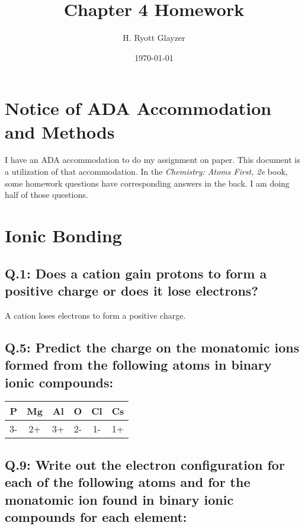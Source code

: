 \documentclass[11pt, letterpaper]{article}
\begin{document}


\title{Chapter 4 Homework}
\author{H. Ryott Glayzer}
\date{\today}


\maketitle

\section*{Notice of ADA Accommodation and Methods}
I have an ADA accommodation to do my assignment on paper.
This document is a utilization of that accommodation.
In the \textit{Chemistry: Atoms First, 2e} book,
some homework questions have corresponding answers in the back.
I am doing half of those questions.

\section{Ionic Bonding}

\subsection*{Q.1: Does a cation gain protons to form a positive charge or does it lose electrons?}
A cation loses electrons to form a positive charge.

\subsection*{Q.5: Predict the charge on the monatomic ions formed
from the following atoms in binary ionic compounds:}

\begin{center}
	\begin{tabular}{|c|c|c|c|c|c|}
		\hline
		P & Mg & Al & O & Cl & Cs \\
		\hline
		3- & 2+ & 3+ & 2- & 1- & 1+ \\
		\hline		
	\end{tabular}
\end{center}


\subsection*{Q.9: Write out the electron configuration for each of the following atoms
and for the monatomic ion found in binary ionic compounds for each element:}
\end{document}
